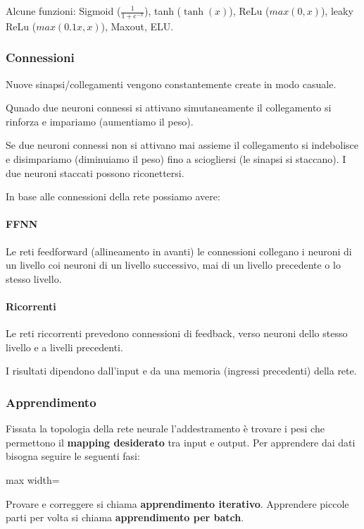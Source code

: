 Alcune funzioni: Sigmoid ($\frac{1}{1+e^{-x}}$), tanh ($\tanh(x)$), ReLu ($max(0, x)$), leaky ReLu ($max(0.1x, x)$), Maxout, ELU.
\subsubsection{Connessioni}
Nuove sinapsi/collegamenti vengono constantemente create in modo casuale.

Qunado due neuroni connessi si attivano simutaneamente il collegamento si rinforza e impariamo (aumentiamo il peso).

Se due neuroni connessi non si attivano mai assieme il collegamento si indebolisce e disimpariamo (diminuiamo il peso) fino a sciogliersi (le sinapsi si staccano). I due neuroni staccati possono riconettersi.

In base alle connessioni della rete possiamo avere:
\paragraph{FFNN} Le reti feedforward (allineamento in avanti) le connessioni collegano i neuroni di un livello coi neuroni di un livello successivo, mai di un livello precedente o lo stesso livello.
\paragraph{Ricorrenti} Le reti riccorrenti prevedono connessioni di feedback, verso neuroni dello stesso livello e a livelli precedenti.

I risultati dipendono dall'input e da una memoria (ingressi precedenti) della rete.
\subsubsection{Apprendimento}
Fissata la topologia della rete neurale l'addestramento è trovare i pesi che permettono il \textbf{mapping desiderato} tra input e output.
Per apprendere dai dati bisogna seguire le seguenti fasi:
\begin{center}
	\begin{adjustbox}{max width=\textwidth}
	\end{adjustbox}
\end{center}
Provare e correggere si chiama \textbf{apprendimento iterativo}. Apprendere piccole parti per volta si chiama \textbf{apprendimento per batch}.


